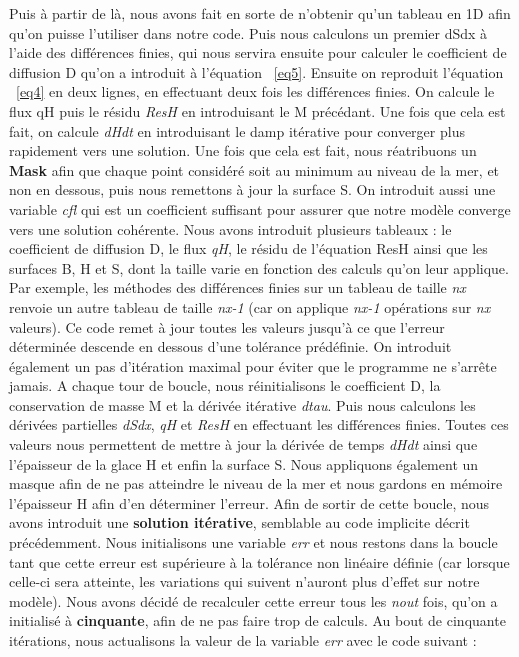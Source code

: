 \documentclass{article}
\begin{document}
\newpage
Puis à partir de là, nous avons fait en sorte de n'obtenir qu'un tableau en 1D afin qu'on puisse l'utiliser dans notre code. Puis nous calculons un premier dSdx à l'aide des différences finies, qui nous servira ensuite pour calculer le coefficient de diffusion D qu'on a introduit à l'équation ~\eqref{eq5}. Ensuite on reproduit l'équation ~\eqref{eq4} en deux lignes, en effectuant deux fois les différences finies. On calcule le flux qH puis le résidu \textit{ResH} en introduisant le M précédant. Une fois que cela est fait, on calcule \textit{dHdt} en introduisant le damp itérative pour converger plus rapidement vers une solution. Une fois que cela est fait, nous réatribuons un \textbf{Mask} afin que chaque point considéré soit au minimum au niveau de la mer, et non en dessous, puis nous remettons à jour la surface S. On introduit aussi une variable \textit{cfl} qui est un coefficient suffisant pour assurer que notre modèle converge vers une solution cohérente.
\newline
\newline
Nous avons introduit plusieurs tableaux : le coefficient de diffusion D, le flux \textit{qH}, le résidu de l'équation ResH ainsi que les surfaces B, H et S, dont la taille varie en fonction des calculs qu'on leur applique. Par exemple, les méthodes des différences finies sur un tableau de taille \textit{nx} renvoie un autre tableau de taille \textit{nx-1} (car on applique \textit{nx-1} opérations sur \textit{nx} valeurs).
\newline
\newline
Ce code remet à jour toutes les valeurs jusqu'à ce que l'erreur déterminée descende en dessous d'une tolérance prédéfinie. On introduit également un pas d'itération maximal pour éviter que le programme ne s'arrête jamais.
\newline
\newline
A chaque tour de boucle, nous réinitialisons le coefficient D, la conservation de masse M et la dérivée itérative \textit{dtau}. Puis nous calculons les dérivées partielles \textit{dSdx}, \textit{qH} et \textit{ResH} en effectuant les différences finies. Toutes ces valeurs nous permettent de mettre à jour la dérivée de temps \textit{dHdt} ainsi que l'épaisseur de la glace H et enfin la surface S. Nous appliquons également un masque afin de ne pas atteindre le niveau de la mer et nous gardons en mémoire l'épaisseur H afin d'en déterminer l'erreur.
\newpage
Afin de sortir de cette boucle, nous avons introduit une \textbf{solution itérative}, semblable au code implicite décrit précédemment. Nous initialisons une variable \textit{err} et nous restons dans la boucle tant que cette erreur est supérieure à la tolérance non linéaire définie (car lorsque celle-ci sera atteinte, les variations qui suivent n'auront plus d'effet sur notre modèle). Nous avons décidé de recalculer cette erreur tous les \textit{nout} fois, qu'on a initialisé à \textbf{cinquante}, afin de ne pas faire trop de calculs. Au bout de cinquante itérations, nous actualisons la valeur de la variable \textit{err} avec le code suivant :
\end{document}
